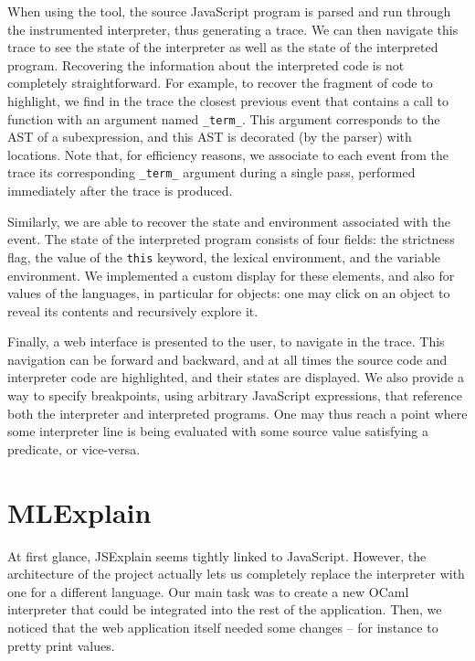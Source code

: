 \documentclass[twocolumn]{article}
\begin{document}
When using the tool, the source JavaScript program is parsed and run through the
instrumented interpreter, thus generating a trace. We can then navigate this
trace to see the state of the interpreter as well as the state of the
interpreted program. Recovering the information about the interpreted code is
not completely straightforward. For example, to recover the fragment of code to
highlight, we find in the trace the closest previous event that contains a call
to function with an argument named \texttt{\_term\_}. This argument corresponds
to the AST of a subexpression, and this AST is decorated (by the parser) with
locations. Note that, for efficiency reasons, we associate to each event from
the trace its corresponding \texttt{\_term\_} argument during a single pass,
performed immediately after the trace is produced.

Similarly, we are able to recover the state and environment associated with the
event. The state of the interpreted program consists of four fields: the
strictness flag, the value of the \texttt{this} keyword, the lexical
environment, and the variable environment. We implemented a custom display for
these elements, and also for values of the languages, in particular for objects:
one may click on an object to reveal its contents and recursively explore it.

Finally, a web interface is presented to the user, to navigate in the trace.
This navigation can be forward and backward, and at all times the source code
and interpreter code are highlighted, and their states are displayed. We also
provide a way to specify breakpoints, using arbitrary JavaScript expressions,
that reference both the interpreter and interpreted programs. One may thus reach
a point where some interpreter line is being evaluated with some source value
satisfying a predicate, or vice-versa.

\section{MLExplain}

At first glance, JSExplain seems tightly linked to JavaScript. However, the
architecture of the project actually lets us completely replace the interpreter
with one for a different language. Our main task was to create a new OCaml
interpreter that could be integrated into the rest of the application. Then, we
noticed that the web application itself needed some changes -- for instance to
pretty print values.

\end{document}
